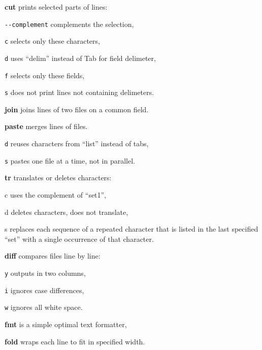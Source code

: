 \begin{compactenum}
	\item [\cmdcore] \textbf{cut} prints selected parts of lines:
	\item [] \texttt{-}\texttt{-}\texttt{complement} complements the selection,
	\item [\texttt{c}] selects only these characters,
	\item [\texttt{d}] uses ``delim'' instead of Tab for field delimeter,
	\item [\texttt{f}] selects only these fields,
	\item [\texttt{s}] does not print lines not containing delimeters.
	\item [\cmdcore] \textbf{join} joins lines of two files on a common field.
	\item [\cmdcore] \textbf{paste} merges lines of files.
	\item [\texttt{d}] reuses characters from ``list'' instead of tabs,
	\item [\texttt{s}] pastes one file at a time, not in parallel.
	\item [\cmdcore] \textbf{tr} translates or deletes characters:
	\item [c] uses the complement of ``set1'',
	\item [d] deletes characters, does not translate,
	\item [s] replaces each sequence of a repeated character that is listed 
	in the last specified ``set'' with a single occurrence of that character.
\end{compactenum}

\begin{compactenum}
	\item [\cmdvar] \textbf{diff} compares files line by line:
	\item [\texttt{y}] outputs in two columns,
	\item [\texttt{i}] ignores case differences,
	\item [\texttt{w}] ignores all white space.
\end{compactenum}

\begin{compactenum}
	\item [\cmdvar] \textbf{fmt} is a simple optimal text formatter, 
	\item [\cmdvar] \textbf{fold} wraps each line to fit in specified width.
\end{compactenum}

